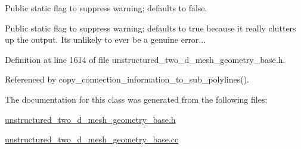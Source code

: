 Public static flag to suppress warning; defaults to false. 

Public static flag to suppress warning; defaults to true because it really clutters up the output. It\textquotesingle{}s unlikely to ever be a genuine error... 

Definition at line 1614 of file unstructured\+\_\+two\+\_\+d\+\_\+mesh\+\_\+geometry\+\_\+base.\+h.



Referenced by copy\+\_\+connection\+\_\+information\+\_\+to\+\_\+sub\+\_\+polylines().



The documentation for this class was generated from the following files\+:\begin{DoxyCompactItemize}
\item 
\hyperlink{unstructured__two__d__mesh__geometry__base_8h}{unstructured\+\_\+two\+\_\+d\+\_\+mesh\+\_\+geometry\+\_\+base.\+h}\item 
\hyperlink{unstructured__two__d__mesh__geometry__base_8cc}{unstructured\+\_\+two\+\_\+d\+\_\+mesh\+\_\+geometry\+\_\+base.\+cc}\end{DoxyCompactItemize}
